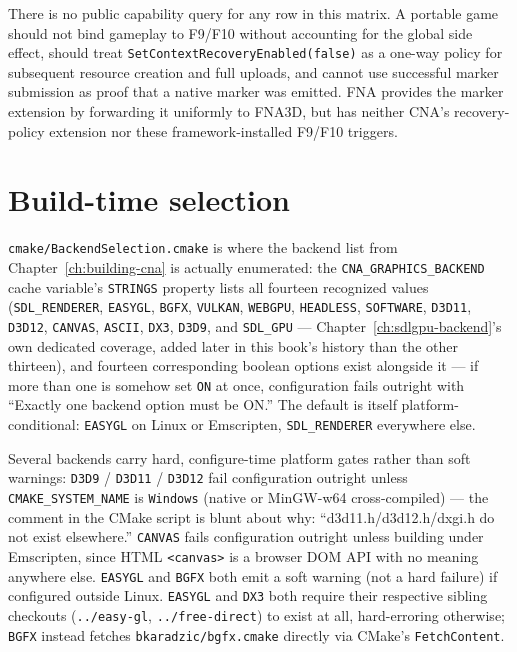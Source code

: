 There is no public capability query for any row in this matrix. A portable game should not
bind gameplay to F9/F10 without accounting for the global side effect, should treat
\texttt{SetContextRecoveryEnabled(false)} as a one-way policy for subsequent resource
creation and full uploads, and cannot use successful marker submission as proof that a native
marker was emitted. FNA provides the marker extension by forwarding it uniformly to FNA3D,
but has neither CNA's recovery-policy extension nor these framework-installed F9/F10
triggers.

\section{Build-time selection}

\texttt{cmake/BackendSelection.cmake} is where the backend list from
Chapter~\ref{ch:building-cna} is actually enumerated: the \texttt{CNA\_GRAPHICS\_BACKEND}
cache variable's \texttt{STRINGS} property lists all fourteen recognized values
(\texttt{SDL\_RENDERER}, \texttt{EASYGL}, \texttt{BGFX}, \texttt{VULKAN}, \texttt{WEBGPU},
\texttt{HEADLESS}, \texttt{SOFTWARE}, \texttt{D3D11}, \texttt{D3D12}, \texttt{CANVAS},
\texttt{ASCII}, \texttt{DX3}, \texttt{D3D9}, and \texttt{SDL\_GPU} ---
Chapter~\ref{ch:sdlgpu-backend}'s own dedicated coverage, added later in this book's history
than the other thirteen), and fourteen corresponding boolean
options exist alongside it --- if more than one is somehow set \texttt{ON} at once,
configuration fails outright with ``Exactly one backend option must be ON.'' The default is
itself platform-conditional: \texttt{EASYGL} on Linux or Emscripten, \texttt{SDL\_RENDERER}
everywhere else.

Several backends carry hard, configure-time platform gates rather than soft warnings:
\texttt{D3D9} / \texttt{D3D11} / \texttt{D3D12} fail configuration outright unless
\texttt{CMAKE\_SYSTEM\_NAME} is \texttt{Windows} (native or MinGW-w64 cross-compiled) ---
the comment in the CMake script is blunt about why: ``d3d11.h/d3d12.h/dxgi.h do not exist
elsewhere.'' \texttt{CANVAS} fails configuration outright unless building under Emscripten,
since HTML \texttt{<canvas>} is a browser DOM API with no meaning anywhere else.
\texttt{EASYGL} and \texttt{BGFX} both emit a soft warning (not a hard failure) if configured
outside Linux. \texttt{EASYGL} and \texttt{DX3} both require their respective sibling
checkouts (\texttt{../easy-gl}, \texttt{../free-direct}) to exist at all, hard-erroring
otherwise; \texttt{BGFX} instead fetches \texttt{bkaradzic/bgfx.cmake} directly via CMake's
\texttt{FetchContent}.


